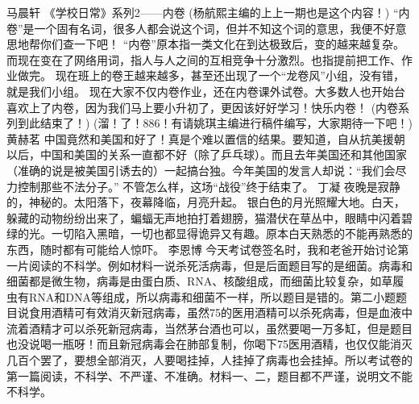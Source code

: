{}\markdownRendererInterblockSeparator
{}马晨轩\markdownRendererInterblockSeparator
{}《学校日常》系列\markdownRendererHash{}2——内卷\markdownRendererInterblockSeparator
{}(杨航熙主编的上上一期也是这个内容！)\markdownRendererInterblockSeparator
{}“内卷”是一个固有名词，很多人都会说这个词，但并不知这个词的意思，我便不好意思地帮你们查一下吧！\markdownRendererInterblockSeparator
{}“内卷”原本指一类文化在到达极致后，变的越来越复杂。而现在变在了网络用词，指人与人之间的互相竞争十分激烈。也指提前把工作、作业做完。\markdownRendererInterblockSeparator
{}现在班上的卷王越来越多，甚至还出现了一个“龙卷风”小组，没有错，就是我们小组。\markdownRendererInterblockSeparator
{}现在大家不仅内卷作业，还在内卷课外试卷。大多数人也开始台喜欢上了内卷，因为我们马上要小升初了，更因该好好学习！快乐内卷！\markdownRendererInterblockSeparator
{}(内卷系列到此结束了！)\markdownRendererInterblockSeparator
{}(溜！了！886！有请姚琪主编进行稿件编写，大家期待一下吧！)\markdownRendererInterblockSeparator
{}\markdownRendererInterblockSeparator
{}黄赫茗\markdownRendererInterblockSeparator
{}中国竟然和美国和好了！真是个难以置信的结果。要知道，自从抗美援朝以后，中国和美国的关系一直都不好（除了乒乓球）。而且去年美国还和其他国家（准确的说是被美国引诱去的）一起搞台独。今年美国的发言人却说：“我们会尽力控制那些不法分子。”\markdownRendererInterblockSeparator
{}不管怎么样，这场“战役”终于结束了。\markdownRendererInterblockSeparator
{}\markdownRendererInterblockSeparator
{}丁凝\markdownRendererInterblockSeparator
{}夜晚是寂静的，神秘的。太阳落下，夜幕降临，月亮升起。\markdownRendererInterblockSeparator
{}银白色的月光照耀大地。白天，躲藏的动物纷纷出来了，蝙蝠无声地拍打着翅膀，猫潜伏在草丛中，眼睛中闪着碧绿的光。一切陷入黑暗，一切也都显得诡异又有趣。原本白天熟悉的不能再熟悉的东西，随时都有可能给人惊吓。\markdownRendererInterblockSeparator
{}\markdownRendererInterblockSeparator
{}李恩博\markdownRendererInterblockSeparator
{}今天考试卷签名时，我和老爸开始讨论第一片阅读的不科学。例如材料一说杀死活病毒，但是后面题目写的是细菌。病毒和细菌都是微生物，病毒是由蛋白质、RNA、核酸组成，而细菌比较复杂，如草履虫有RNA和DNA等组成，所以病毒和细菌不一样，所以题目是错的。第二小题题目说食用酒精可有效消灭新冠病毒，虽然75\markdownRendererPercentSign{}的医用酒精可以杀死病毒，但是血液中流着酒精才可以杀死新冠病毒，当然茅台酒也可以，虽然要喝一万多缸，但是题目也没说喝一瓶呀！而且新冠病毒会在肺部复制，你喝下75\markdownRendererPercentSign{}医用酒精，也仅仅能消灭几百个罢了，要想全部消灭，人要喝挂掉，人挂掉了病毒也会挂掉。所以考试卷的第一篇阅读，不科学、不严谨、不准确。材料一、二，题目都不严谨，说明文不能不科学。\markdownRendererInterblockSeparator
